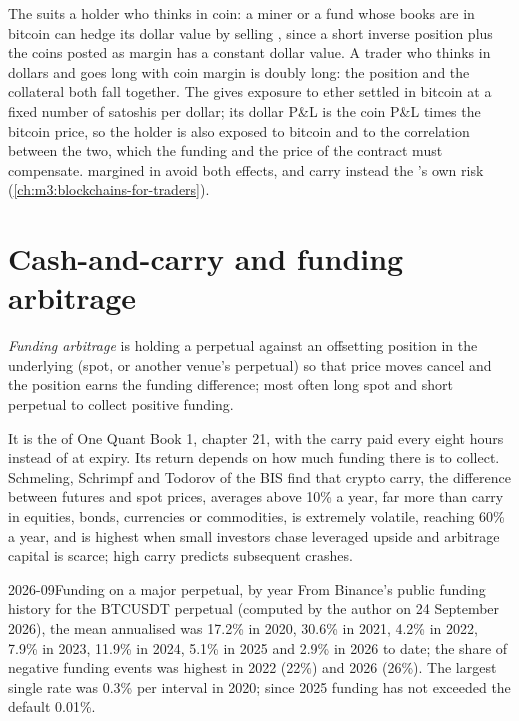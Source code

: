 The  suits a holder who thinks in coin: a miner or a fund whose books are in bitcoin can hedge its
dollar value by selling , since a short inverse position plus the coins posted as margin has a
constant dollar value. A trader who thinks in dollars and goes long with coin margin is doubly long: the position
and the collateral both fall together. The  gives exposure to ether settled in bitcoin at a fixed
number of satoshis per dollar; its dollar P\&L is the coin P\&L times the bitcoin price, so the holder is also
exposed to bitcoin and to the correlation between the two, which the funding and the price of the contract must
compensate.  margined in  avoid both effects, and carry instead the 's own risk
(\cref{ch:m3:blockchains-for-traders}).

\section{Cash-and-carry and funding arbitrage}

\begin{definition}\label{def:m3:perpetual-futures:funding-arb}
\emph{Funding arbitrage} is holding a perpetual against an offsetting position in the
underlying (spot, or another venue's perpetual) so that price moves cancel and the position earns the funding
difference; most often long spot and short perpetual to collect positive funding.
\end{definition}

It is the  of One Quant Book 1, chapter 21, with the carry paid every eight hours instead of at
expiry. Its return depends on how much funding there is to collect. Schmeling, Schrimpf and Todorov of the BIS find
that crypto carry, the difference between futures and spot prices, averages above 10\% a year, far more than carry
in equities, bonds, currencies or commodities, is extremely volatile, reaching 60\% a year, and is highest when small
investors chase leveraged upside and arbitrage capital is scarce; high carry predicts subsequent crashes.

\begin{dated}{2026-09}{Funding on a major perpetual, by year}\label{dat:m3:perpetual-futures:years}
From Binance's public funding history for the BTCUSDT perpetual (computed by the author on 24 September 2026), the
mean  annualised was 17.2\% in 2020, 30.6\% in 2021, 4.2\% in 2022, 7.9\% in 2023, 11.9\% in 2024, 5.1\%
in 2025 and 2.9\% in 2026 to date; the share of negative funding events was highest in 2022 (22\%) and 2026 (26\%).
The largest single rate was 0.3\% per interval in 2020; since 2025 funding has not exceeded the default 0.01\%.
\end{dated}

